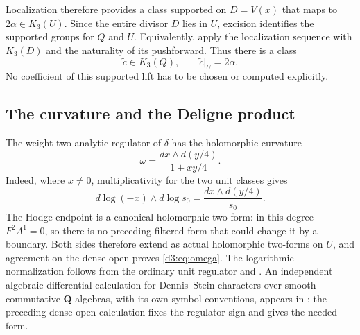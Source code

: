 \documentclass[11pt,a4paper]{amsart}
\numberwithin{equation}{section}
\theoremstyle{definition}
\theoremstyle{remark}
\newcommand{\Q}{\mathbf Q}
\begin{document}
Localization therefore provides a class supported on $D=V(x)$ that maps to $2\alpha\in K_3(U)$. Since the entire divisor $D$ lies in $U$, excision identifies the supported groups for $Q$ and $U$. Equivalently, apply the localization sequence with $K_3(D)$ and the naturality of its pushforward. Thus there is a class
\begin{equation}\label{d3:eq:explicitlift}
\widetilde c\in K_3(Q),\qquad \widetilde c|_U=2\alpha.
\end{equation}
No coefficient of this supported lift has to be chosen or computed explicitly.

\subsection{The curvature and the Deligne product}
The weight-two analytic regulator of $\delta$ has the holomorphic curvature
\begin{equation}\label{d3:eq:omega}
\omega=\frac{dx\wedge d(y/4)}{1+xy/4}.
\end{equation}
Indeed, where $x\neq0$, multiplicativity for the two unit classes gives
\[
d\log(-x)\wedge d\log s_0
=\frac{dx\wedge d(y/4)}{s_0}.
\]
The Hodge endpoint is a canonical holomorphic two-form: in this degree $F^2A^1=0$, so there is no preceding filtered form that could change it by a boundary. Both sides therefore extend as actual holomorphic two-forms on $U$, and agreement on the dense open proves \eqref{d3:eq:omega}. The logarithmic normalization follows from the ordinary unit regulator and \cite[Theorem~2.31 and Lemma~4.5]{BunkeTamme}. An independent algebraic differential calculation for Dennis--Stein characters over smooth commutative $\Q$-algebras, with its own symbol conventions, appears in \cite[Section~3.2, Theorem~3.4 and Corollary~3.6]{Ginot}; the preceding dense-open calculation fixes the regulator sign and gives the needed form.
\end{document}
